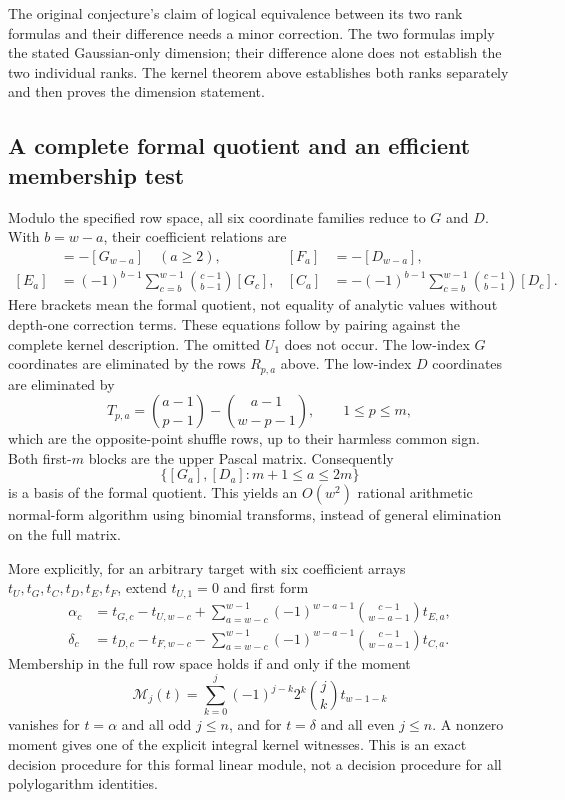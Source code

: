 \documentclass[11pt]{article}
\numberwithin{equation}{section}
\theoremstyle{plain}
\theoremstyle{definition}
\theoremstyle{remark}
\begin{document}
The original conjecture's claim of logical equivalence between its two
rank formulas and their difference needs a minor correction. The two
formulas imply the stated Gaussian-only dimension; their difference
alone does not establish the two individual ranks. The kernel theorem
above establishes both ranks separately and then proves the dimension
statement.

\subsection{A complete formal quotient and an efficient membership test}
Modulo the specified row space, all six coordinate families reduce to
$G$ and $D$. With $b=w-a$, their coefficient relations are
\begin{align*}
 [U_a]&=-[G_{w-a}]\quad(a\ge2),&
 [F_a]&=-[D_{w-a}],\\
 [E_a]&=(-1)^{b-1}\sum_{c=b}^{w-1}\binom{c-1}{b-1}[G_c],&
 [C_a]&=-(-1)^{b-1}\sum_{c=b}^{w-1}\binom{c-1}{b-1}[D_c].
\end{align*}
Here brackets mean the formal quotient, not equality of analytic
values without depth-one correction terms. These equations follow by
pairing against the complete kernel description. The omitted $U_1$
does not occur. The low-index $G$ coordinates are eliminated by the
rows $R_{p,a}$ above. The low-index $D$ coordinates are eliminated by
\[
 T_{p,a}=\binom{a-1}{p-1}-\binom{a-1}{w-p-1},\qquad 1\le p\le m,
\]
which are the opposite-point shuffle rows, up to their harmless common
sign. Both first-$m$ blocks are the upper Pascal matrix. Consequently
\[
 \{[G_a],[D_a]:m+1\le a\le2m\}
\]
is a basis of the formal quotient. This yields an $O(w^2)$ rational
arithmetic normal-form algorithm using binomial transforms, instead of
general elimination on the full matrix.

More explicitly, for an arbitrary target with six coefficient arrays
$t_U,t_G,t_C,t_D,t_E,t_F$, extend $t_{U,1}=0$ and first form
\begin{align*}
 \alpha_c&=t_{G,c}-t_{U,w-c}
  +\sum_{a=w-c}^{w-1}(-1)^{w-a-1}
         \binom{c-1}{w-a-1}t_{E,a},\\
 \delta_c&=t_{D,c}-t_{F,w-c}
  -\sum_{a=w-c}^{w-1}(-1)^{w-a-1}
         \binom{c-1}{w-a-1}t_{C,a}.
\end{align*}
Membership in the full row space holds if and only if the moment
\[
 \mathcal M_j(t)=\sum_{k=0}^j(-1)^{j-k}2^k\binom jk t_{w-1-k}
\]
vanishes for $t=\alpha$ and all odd $j\le n$, and for $t=\delta$ and
all even $j\le n$. A nonzero moment gives one of the explicit integral
kernel witnesses. This is an exact decision procedure for this formal
linear module, not a decision procedure for all polylogarithm identities.
\end{document}
